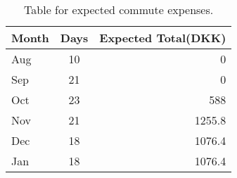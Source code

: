 \documentclass{article}
\begin{document}
	\begin{table}[h!]
		\begin{center}
			\caption{Table for expected commute expenses.}
			\begin{tabular}{lcr} %
				\textbf{Month} & \textbf{Days} & \textbf{Expected Total(DKK)}\\
				\hline
				Aug & 10 & 0\\
				Sep & 21 & 0\\
				Oct & 23 & 588\\
				Nov & 21 & 1255.8\\
				Dec & 18 & 1076.4\\
				Jan & 18 & 1076.4\\
				\hline
			\end{tabular}
		\end{center}
	\end{table}
\end{document}
